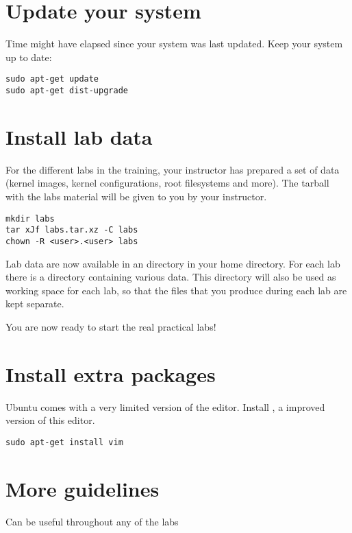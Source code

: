 
\section{Update your system}

Time might have elapsed since your system was last updated. Keep your
system up to date:

\begin{verbatim}
sudo apt-get update
sudo apt-get dist-upgrade
\end{verbatim}

\section{Install lab data}
For the different labs in the training, your instructor has prepared a
set of data (kernel images, kernel configurations, root filesystems
and more). The tarball with the labs material will be given to you by
your instructor.

\begin{verbatim}
mkdir labs
tar xJf labs.tar.xz -C labs
chown -R <user>.<user> labs
\end{verbatim}

Lab data are now available in an  directory in your home
directory. For each lab there is a directory containing various
data. This directory will also be used as working space for each lab,
so that the files that you produce during each lab are kept separate.

You are now ready to start the real practical labs!

\section{Install extra packages}

Ubuntu comes with a very limited version of the 
editor. Install , a improved version of this editor.

\begin{verbatim}
sudo apt-get install vim
\end{verbatim}

\section{More guidelines}

Can be useful throughout any of the labs

